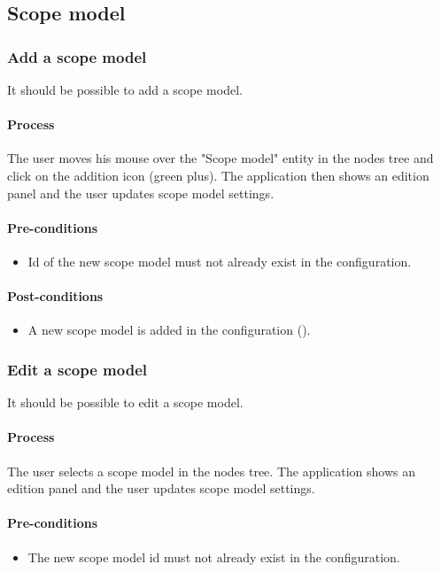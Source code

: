\documentclass[11pt,a4paper,oneside]{article}
\begin{document}
\subsection{Scope model}

\subsubsection{Add a scope model}
It should be possible to add a scope model.

\paragraph{Process}
The user moves his mouse over the "Scope model" entity in the nodes tree and click on the addition icon (green plus). The application then shows an edition panel and the user updates scope model settings.

\paragraph{Pre-conditions}
\begin{itemize}
	\item Id of the new scope model must not already exist in the configuration.
\end{itemize}

\paragraph{Post-conditions}
\begin{itemize}
	\item A new scope model is added in the configuration ().
\end{itemize}

\subsubsection{Edit a scope model}
It should be possible to edit a scope model.

\paragraph{Process}
The user selects a scope model in the nodes tree. The application shows an edition panel and the user updates scope model settings.

\paragraph{Pre-conditions}
\begin{itemize}
	\item The new scope model id must not already exist in the configuration.
\end{itemize}
\end{document}
